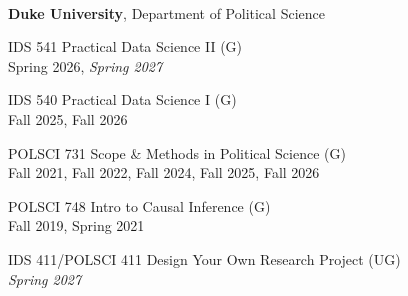 \documentclass[11pt]{article}
\begin{document}
\vspace{.20in}
\begin{minipage}[t]{.21\textwidth}
	\flushright
	\hspace*{.2in} \\
\end{minipage}
\begin{minipage}[t]{.79\textwidth}

	\textbf{Duke University}, Department of Political Science \\
	\vspace{-.13in}

	\hspace*{.1in} IDS 541\hspace{.1in} Practical Data Science II (G)\\
	\hspace*{.1in} Spring 2026, \emph{Spring 2027} \\
	\vspace{-.05in}

	\hspace*{.1in} IDS 540\hspace{.1in} Practical Data Science I (G)\\
	\hspace*{.1in} Fall 2025, Fall 2026 \\
	\vspace{-.05in}


	\hspace*{.1in} POLSCI 731\hspace{.1in} Scope \& Methods in Political Science (G)\\
	\hspace*{.1in} Fall 2021, Fall 2022, Fall 2024, Fall 2025, Fall 2026 \\
	\vspace{-.05in}

	\hspace*{.1in} POLSCI 748\hspace{.1in} Intro to Causal Inference (G) \\
	\hspace*{.1in} Fall 2019, Spring 2021\\
	\vspace{-.05in}

	\hspace*{.1in} IDS 411/POLSCI 411\hspace{.1in} Design Your Own Research Project (UG) \\
	\hspace*{.1in} \emph{Spring 2027} \\
	\vspace{-.05in}


\end{minipage}
\end{document}
